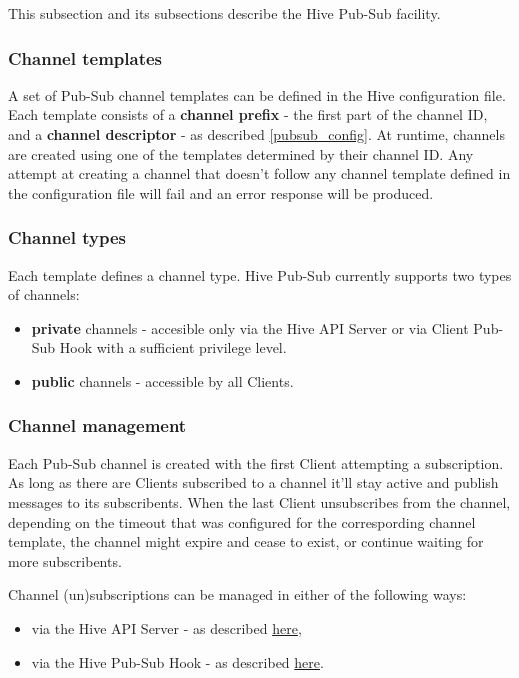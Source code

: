 \documentclass[a4paper]{article}
\begin{document}
This subsection and its subsections describe the Hive Pub-Sub facility.
\subsubsection{Channel templates}
\label{sec-7-3-1}

A set of Pub-Sub channel templates can be defined in the Hive configuration file. Each template consists of a \textbf{channel prefix} - the first part of the channel ID, and a \textbf{channel descriptor} - as described \ref{pubsub_config}. At runtime, channels are created using one of the templates determined by their channel ID. Any attempt at creating a channel that doesn't follow any channel template defined in the configuration file will fail and an error response will be produced.
\subsubsection{Channel types}
\label{sec-7-3-2}

Each template defines a channel type. Hive Pub-Sub currently supports two types of channels:


\begin{itemize}
\item \textbf{private} channels - accesible only via the Hive API Server or via Client Pub-Sub Hook with a sufficient privilege level.
\item \textbf{public} channels - accessible by all Clients.
\end{itemize}
\subsubsection{Channel management}
\label{sec-7-3-3}

Each Pub-Sub channel is created with the first Client attempting a subscription. As long as there are Clients subscribed to a channel it'll stay active and publish messages to its subscribents. When the last Client unsubscribes from the channel, depending on the timeout that was configured for the correspording channel template, the channel might expire and cease to exist, or continue waiting for more subscribents.

\noindent
Channel (un)subscriptions can be managed in either of the following ways:


\begin{itemize}
\item via the Hive API Server - as described \hyperref[sec-6-1-6]{here},
\item via the Hive Pub-Sub Hook - as described \hyperref[sec-8-2-4]{here}.
\end{itemize}
\end{document}
